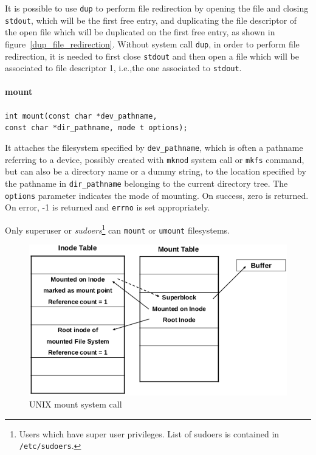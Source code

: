 It is possible to use \texttt{dup} to perform file redirection by opening the file and closing \texttt{stdout}, which will be the first free entry, and duplicating the file descriptor of the open file which will be duplicated on the first free entry, as shown in figure~\ref{dup_file_redirection}. Without system call \texttt{dup}, in order to perform file redirection, it is needed to first close \texttt{stdout} and then open a file which will be associated to file descriptor 1, i.e.,\@ the one associated to \texttt{stdout}.

\paragraph{mount}
\texttt{int mount(const char *dev\_pathname, \\ const char *dir\_pathname, mode t options);}

It attaches the filesystem specified by \texttt{dev\_pathname}, which is often a pathname referring to a device, possibly created with \texttt{mknod} system call or \texttt{mkfs} command, but can also be a directory name or a dummy string, to the location specified by the pathname in \texttt{dir\_pathname} belonging to the current directory tree. The \texttt{options} parameter indicates the mode of mounting. On success, zero is
returned. On error, -1 is returned and
\texttt{errno} is set appropriately.

Only superuser or \emph{sudoers}\footnote{Users which have super user privileges. List of sudoers is contained in \texttt{/etc/sudoers}.} can \texttt{mount} or \texttt{umount} filesystems.

\begin{figure}[hbtp]
\centering
\includegraphics[scale=0.35]{images/file_system/mount.png}
\caption{UNIX mount system call}
\end{figure}

